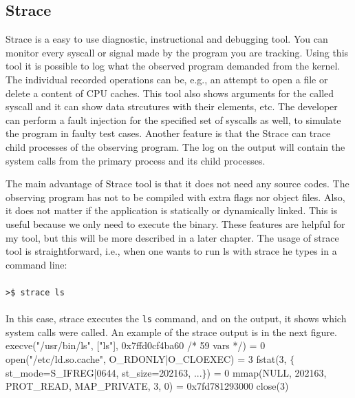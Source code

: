 \subsection{Strace}
\label{sec:strace}

Strace \cite{strace_man} is a easy to use diagnostic, instructional and debugging tool.
You can monitor every syscall or signal made by the program you are tracking.
Using this tool it is possible to log what the observed program demanded from the kernel.
The individual recorded operations can be, e.g., an attempt to open a file or delete a content of CPU caches.
This tool also shows arguments for the called syscall and it can show data strcutures with their elements, etc.
The developer can perform a fault injection for the specified set of syscalls as well, to simulate the program in faulty test cases.
Another feature is that the Strace can trace child processes of the observing program.
The log on the output will contain the system calls from the primary process and its child processes.

The main advantage of Strace tool is that it does not need any source codes.
The observing program has not to be compiled with extra flags nor object files.
Also, it does not matter if the application is statically or dynamically linked.
This is useful because we only need to execute the binary.
These features are helpful for my tool, but this will be more described in a later chapter.
The usage of strace tool is straightforward, i.e., when one wants to run ls with strace he types in a command line:\\
\\
\texttt{>\$ strace ls}\\
\\
In this case, strace executes the \texttt{ls} command, and on the output, it shows which system calls were called.
An example of the strace output is in the next figure.\\[2mm]

\selectfont\noindent
execve("/usr/bin/ls", ["ls"], 0x7ffd0cf4ba60 /* 59 vars */) = 0\linebreak
open("/etc/ld.so.cache", O\_RDONLY|O\_CLOEXEC) = 3\linebreak
fstat(3, $\{$ st\_mode=S\_IFREG|0644, st\_size=202163, ...$\}$) = 0\linebreak
mmap(NULL, 202163, PROT\_READ, MAP\_PRIVATE, 3, 0) = 0x7fd781293000\linebreak
close(3)\linebreak
\fontfamily{\familydefault}\selectfont

